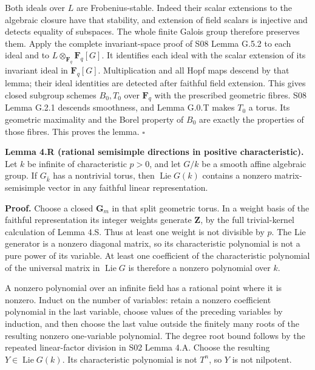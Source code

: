 \documentclass[11pt,a4paper,openany]{report}
\begin{document}
Both ideals over \(L\) are Frobenius-stable. Indeed their scalar extensions to the algebraic closure have that stability, and extension of field scalars is injective and detects equality of subspaces. The whole finite Galois group therefore preserves them. Apply the complete invariant-space proof of S08 Lemma G.5.2 to each ideal and to \(L\otimes_{\mathbf F_q}\mathbf F_q[G]\). It identifies each ideal with the scalar extension of its invariant ideal in \(\mathbf F_q[G]\). Multiplication and all Hopf maps descend by that lemma; their ideal identities are detected after faithful field extension. This gives closed subgroup schemes \(B_0,T_0\) over \(\mathbf F_q\) with the prescribed geometric fibres. S08 Lemma G.2.1 descends smoothness, and Lemma G.0.T makes \(T_0\) a torus. Its geometric maximality and the Borel property of \(B_0\) are exactly the properties of those fibres. This proves the lemma. \(\square\)

\label{AG-RG-01-rational-semisimple-directions-and-torus-preimages}

\textbf{Lemma 4.R (rational semisimple directions in positive characteristic).} Let \(k\) be infinite of characteristic \(p>0\), and let \(G/k\) be a smooth affine algebraic group. If \(G_{\bar k}\) has a nontrivial torus, then \(\operatorname{Lie}G(k)\) contains a nonzero matrix-semisimple vector in any faithful linear representation.

\textbf{Proof.} Choose a closed \(\mathbf G_m\) in that split geometric torus. In a weight basis of the faithful representation its integer weights generate \(\mathbf Z\), by the full trivial-kernel calculation of Lemma 4.S. Thus at least one weight is not divisible by \(p\). The Lie generator is a nonzero diagonal matrix, so its characteristic polynomial is not a pure power of its variable. At least one coefficient of the characteristic polynomial of the universal matrix in \(\operatorname{Lie}G\) is therefore a nonzero polynomial over \(k\).

A nonzero polynomial over an infinite field has a rational point where it is nonzero. Induct on the number of variables: retain a nonzero coefficient polynomial in the last variable, choose values of the preceding variables by induction, and then choose the last value outside the finitely many roots of the resulting nonzero one-variable polynomial. The degree root bound follows by the repeated linear-factor division in S02 Lemma 4.A. Choose the resulting \(Y\in\operatorname{Lie}G(k)\). Its characteristic polynomial is not \(T^n\), so \(Y\) is not nilpotent.
\end{document}
